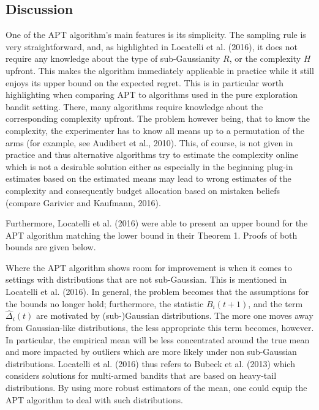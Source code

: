 \documentclass[12pt,]{article}
\begin{document}
\newpage

\subsection{\texorpdfstring{Discussion
\label{sec:DiscussionLocatelli}}{Discussion }}\label{discussion}

One of the APT algorithm's main features is its simplicity. The sampling
rule is very straightforward, and, as highlighted in Locatelli et al.
(2016), it does not require any knowledge about the type of
sub-Gaussianity \(R\), or the complexity \(H\) upfront. This makes the
algorithm immediately applicable in practice while it still enjoys its
upper bound on the expected regret. This is in particular worth
highlighting when comparing APT to algorithms used in the pure
exploration bandit setting. There, many algorithms require knowledge
about the corresponding complexity upfront. The problem however being,
that to know the complexity, the experimenter has to know all means up
to a permutation of the arms (for example, see Audibert et al., 2010).
This, of course, is not given in practice and thus alternative
algorithms try to estimate the complexity online which is not a
desirable solution either as especially in the beginning plug-in
estimates based on the estimated means may lead to wrong estimates of
the complexity and consequently budget allocation based on mistaken
beliefs (compare Garivier and Kaufmann, 2016).

Furthermore, Locatelli et al. (2016) were able to present an upper bound
for the APT algorithm matching the lower bound in their Theorem 1.
Proofs of both bounds are given below.

Where the APT algorithm shows room for improvement is when it comes to
settings with distributions that are not sub-Gaussian. This is mentioned
in Locatelli et al. (2016). In general, the problem becomes that the
assumptions for the bounds no longer hold; furthermore, the statistic
\(B_i(t+1)\), and the term \(\hat{\Delta}_i(t)\) are motivated by
(sub-)Gaussian distributions. The more one moves away from Gaussian-like
distributions, the less appropriate this term becomes, however. In
particular, the empirical mean will be less concentrated around the true
mean and more impacted by outliers which are more likely under non
sub-Gaussian distributions. Locatelli et al. (2016) thus refers to
Bubeck et al. (2013) which considers solutions for multi-armed bandits
that are based on heavy-tail distributions. By using more robust
estimators of the mean, one could equip the APT algorithm to deal with
such distributions.
\end{document}
